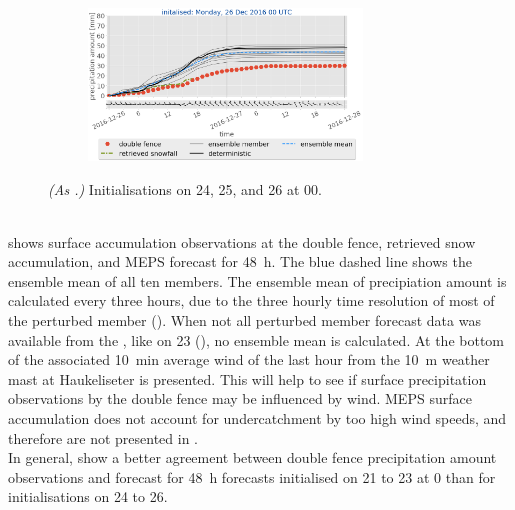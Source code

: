 \begin{figure}[H]
\begin{subfigure}[t]{0.97\textwidth}
		\caption{}\label{fig:sfc_acc26}
	\end{subfigure}
	\begin{subfigure}[t]{\textwidth}
		\centering
		\includegraphics[trim={1.2cm 0cm 1.1cm 21.4cm},clip,width=0.8\textwidth]{./fig_sfc_acc/acc_wind_20161226_00}
	\end{subfigure}
	\caption{\textit{(As .)} Initialisations on \num{24}, \num{25}, and \SI{26}{\dec} at \SI{00}{\UTC}. }\label{fig:sfc_acc:2426}
\end{figure}
\noindent
\\
 shows surface accumulation observations at the double fence, retrieved snow accumulation, and MEPS forecast for \SI{48}{\hour}.  
The blue dashed line shows the ensemble mean of all ten members. The ensemble mean of precipiation amount is calculated every three hours, due to the three hourly time resolution of most of the perturbed member ().
When not all perturbed member forecast data was available from the \citet{norwegian_meteorological_institute_met_2016}, like on \SI{23}{\dec} (), no ensemble mean is calculated. 
At the bottom of  the associated \SI{10}{\minute} average wind of the last hour from the \SI{10}{\metre} weather mast at Haukeliseter is presented. This will help to see if surface precipitation observations by the double fence may be influenced by wind. MEPS surface accumulation does not account for undercatchment by too high wind speeds, and therefore are not presented in .
\\
In general,  show a better agreement between double fence precipitation amount observations and forecast for \SI{48}{\hour} forecasts initialised on \num{21} to \SI{23}{\dec} at \SI{0}{\UTC} than for initialisations on \num{24} to \SI{26}{\dec}. 
